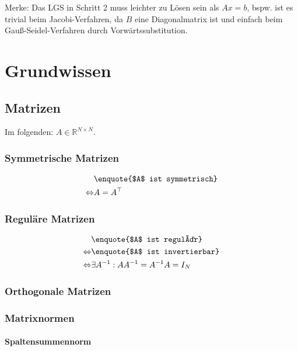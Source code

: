 \documentclass[a4paper, 14pt]{article}
\begin{document}
	Merke: Das LGS in Schritt 2 muss leichter zu Lösen sein als $Ax = b$, bspw. ist es trivial beim Jacobi-Verfahren, da $B$ eine Diagonalmatrix ist und einfach beim Gauß-Seidel-Verfahren durch Vorwärtssubstitution.

	\section{Grundwissen}

	\subsection{Matrizen}

	Im folgenden: $A \in \mathbb{R}^{N \times N}$.

	\subsubsection{Symmetrische Matrizen}

	\begin{align}
		& \textrm{\enquote{$A$ ist symmetrisch}} \\
		\Leftrightarrow & A = A^\top
	\end{align}

	\subsubsection{Reguläre Matrizen}

	\begin{align}
		& \textrm{\enquote{$A$ ist regulär}} \\
		\Leftrightarrow & \textrm{\enquote{$A$ ist invertierbar}} \\
		\Leftrightarrow & \exists A^{-1} : A A^{-1} =  A^{-1} A = I_N
	\end{align}

	\subsubsection{Orthogonale Matrizen}

	\subsubsection{Matrixnormen}

	\paragraph{Spaltensummennorm}
\end{document}
